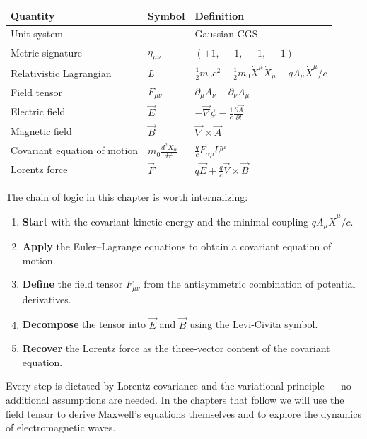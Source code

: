 \begin{table}[h]
\centering
\begin{tabular}{lll}
\hline
\textbf{Quantity} & \textbf{Symbol} & \textbf{Definition} \\
\hline
Unit system & --- & Gaussian CGS \\
Metric signature & $\eta_{\mu\nu}$ & $(+1,\,-1,\,-1,\,-1)$ \\
Relativistic Lagrangian & $L$ & $\frac{1}{2}m_0 c^2 - \frac{1}{2}m_0\dot{X}^\mu\dot{X}_\mu - qA_\mu\dot{X}^\mu/c$ \\
Field tensor & $F_{\mu\nu}$ & $\partial_\mu A_\nu - \partial_\nu A_\mu$ \\
Electric field & $\vec{E}$ & $-\vec{\nabla}\phi - \frac{1}{c}\frac{\partial\vec{A}}{\partial t}$ \\
Magnetic field & $\vec{B}$ & $\vec{\nabla}\times\vec{A}$ \\
Covariant equation of motion & $m_0\frac{d^2X_\alpha}{d\tau^2}$ & $\frac{q}{c}F_{\alpha\mu}U^\mu$ \\
Lorentz force & $\vec{F}$ & $q\vec{E} + \frac{q}{c}\vec{V}\times\vec{B}$ \\
\hline
\end{tabular}
\end{table}

The chain of logic in this chapter is worth internalizing:

\begin{enumerate}
\item \textbf{Start} with the covariant kinetic energy and the minimal coupling $qA_\mu\dot{X}^\mu/c$.
\item \textbf{Apply} the Euler--Lagrange equations to obtain a covariant equation of motion.
\item \textbf{Define} the field tensor $F_{\mu\nu}$ from the antisymmetric combination of potential derivatives.
\item \textbf{Decompose} the tensor into $\vec{E}$ and $\vec{B}$ using the Levi-Civita symbol.
\item \textbf{Recover} the Lorentz force as the three-vector content of the covariant equation.
\end{enumerate}

Every step is dictated by Lorentz covariance and the variational principle --- no additional assumptions are needed. In the chapters that follow we will use the field tensor to derive Maxwell's equations themselves and to explore the dynamics of electromagnetic waves.
